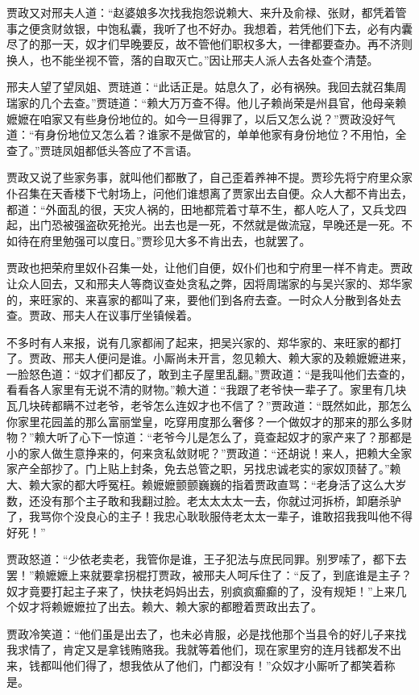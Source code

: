 \documentclass[12pt,oneside]{book}
\begin{document}
贾政又对邢夫人道：“赵婆娘多次找我抱怨说赖大、来升及俞禄、张财，都凭着管事之便贪财敛银，中饱私囊，我听了也不好办。我想着，若凭他们下去，必有内囊尽了的那一天，奴才们早晚要反，故不管他们职权多大，一律都要查办。再不济则换人，也不能坐视不管，落的自取灭亡。”因让邢夫人派人去各处查个清楚。

邢夫人望了望凤姐、贾琏道：“此话正是。姑息久了，必有祸殃。我回去就召集周瑞家的几个去查。”贾琏道：“赖大万万查不得。他儿子赖尚荣是州县官，他母亲赖嬷嬷在咱家又有些身份地位的。如今一旦得罪了，以后又怎么说？”贾政没好气道：“有身份地位又怎么着？谁家不是做官的，单单他家有身份地位？不用怕，全查了。”贾琏凤姐都低头答应了不言语。

贾政又说了些家务事，就叫他们都散了，自己歪着养神不提。贾珍先将宁府里众家仆召集在天香楼下弋射场上，问他们谁想离了贾家出去自便。众人大都不肯出去，都道：“外面乱的很，天灾人祸的，田地都荒着寸草不生，都人吃人了，又兵戈四起，出门恐被强盗砍死抢光。出去也是一死，不然就是做流寇，早晚还是一死。不如待在府里勉强可以度日。”贾珍见大多不肯出去，也就罢了。

贾政也把荣府里奴仆召集一处，让他们自便，奴仆们也和宁府里一样不肯走。贾政让众人回去，又和邢夫人等商议查处贪私之弊，因将周瑞家的与吴兴家的、郑华家的，来旺家的、来喜家的都叫了来，要他们到各府去查。一时众人分散到各处去查。贾政、邢夫人在议事厅坐镇候着。

不多时有人来报，说有几家都闹了起来，把吴兴家的、郑华家的、来旺家的都打了。贾政、邢夫人便问是谁。小厮尚未开言，忽见赖大、赖大家的及赖嬷嬷进来，一脸怒色道：“奴才们都反了，敢到主子屋里乱翻。”贾政道：“是我叫他们去查的，看看各人家里有无说不清的财物。”赖大道：“我跟了老爷快一辈子了。家里有几块瓦几块砖都瞒不过老爷，老爷怎么连奴才也不信了？”贾政道：“既然如此，那怎么你家里花园盖的那么富丽堂皇，吃穿用度那么奢侈？一个做奴才的那来的那么多财物？”赖大听了心下一惊道：“老爷今儿是怎么了，竟查起奴才的家产来了？那都是小的家人做生意挣来的，何来贪私敛财呢？”贾政道：“还胡说！来人，把赖大全家家产全部抄了。门上贴上封条，免去总管之职，另找忠诚老实的家奴顶替了。”赖大、赖大家的都大呼冤枉。赖嬷嬷颤颤巍巍的指着贾政直骂：“老身活了这么大岁数，还没有那个主子敢和我翻过脸。老太太太太一去，你就过河拆桥，卸磨杀驴了，我骂你个没良心的主子！我忠心耿耿服侍老太太一辈子，谁敢招我我叫他不得好死！”

贾政怒道：“少依老卖老，我管你是谁，王子犯法与庶民同罪。别罗嗦了，都下去罢！”赖嬷嬷上来就要拿拐棍打贾政，被邢夫人呵斥住了：“反了，到底谁是主子？奴才竟要打起主子来了，快扶老妈妈出去，别疯疯癫癫的了，没有规矩！”上来几个奴才将赖嬷嬷拉了出去。赖大、赖大家的都瞪着贾政出去了。

贾政冷笑道：“他们虽是出去了，也未必肯服，必是找他那个当县令的好儿子来找我求情了，肯定又是拿钱贿赂我。我就等着他们，现在家里穷的连月钱都发不出来，钱都叫他们得了，想我依从了他们，门都没有！”众奴才小厮听了都笑着称是。
\end{document}
